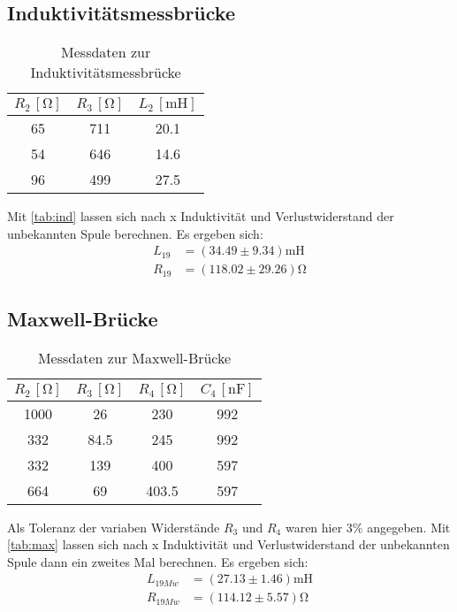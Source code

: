 \subsection{Induktivitätsmessbrücke}
 
\begin{table}
  \centering
  \caption{Messdaten zur Induktivitätsmessbrücke}
  \label{tab:ind}
  \begin{tabular}{c c c}
  \toprule
  $R_2 \, [\si{\ohm}]$ &$R_3 \, [\si{\ohm}]$ &$L_2 \, [\si{\milli} \si{\henry}]$\\
  \midrule
   65 & 711 & 20.1\\
   54 & 646 & 14.6 \\
   96 & 499 & 27.5 \\
  \bottomrule
  \end{tabular}
\end{table}
Mit  \autoref{tab:ind} lassen sich nach x Induktivität und Verlustwiderstand der unbekannten Spule berechnen. Es ergeben sich:
\begin{align}
  L_{19}&=(34.49 \pm 9.34)\si{\milli} \si{\henry}\\
  R_{19}&=(118.02 \pm 29.26)\si{\ohm}
\end{align}

\subsection{Maxwell-Brücke}
\begin{table}
  \centering
  \caption{Messdaten zur Maxwell-Brücke}
  \label{tab:max}
  \begin{tabular}{c c c c}
  \toprule
  $R_2 \, [\si{\ohm}]$ &$R_3 \, [\si{\ohm}]$ &$R_4 \, [\si{\ohm}]$&$C_4 \, [\si{\nano} \si{\farad}]$\\
  \midrule
  1000 & 26 & 230 & 992\\
  332  & 84.5 & 245 & 992\\
  332 & 139 & 400 & 597\\
  664 & 69 & 403.5 & 597\\
  \bottomrule
  \end{tabular}
\end{table}
Als Toleranz der variaben Widerstände $R_3$ und $R_4$ waren hier $3\%$ angegeben.
Mit  \autoref{tab:max} lassen sich nach x Induktivität und Verlustwiderstand der unbekannten Spule dann ein zweites Mal berechnen. Es ergeben sich:
\begin{align}
  L_{19Mw}&=(27.13 \pm 1.46)\si{\milli} \si{\henry}\\
  R_{19Mw}&=(114.12 \pm 5.57)\si{\ohm}
\end{align}


